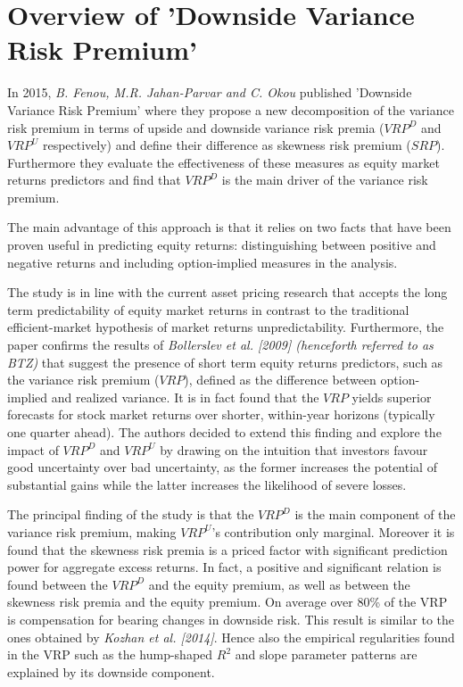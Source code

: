 
\section{Overview of 'Downside Variance Risk Premium'}\label{sec:chapter1}

In 2015,  \textit{ B. Fenou, M.R. Jahan-Parvar and C. Okou} published 'Downside Variance Risk Premium' where they propose a new decomposition of the variance risk premium in terms of upside and downside variance risk premia ($VRP^D$ and $VRP^U$ respectively) and define their difference as skewness risk premium ($SRP$).  Furthermore they evaluate the effectiveness of these measures as equity market returns predictors and find that $VRP^D$ is the main driver of the variance risk premium. 

\vspace{4mm}
The main advantage of this approach is that it relies on two facts that have been proven useful in predicting equity returns: distinguishing between positive and negative returns and including option-implied measures in the analysis. 

\vspace{4mm}
The study is in line with the current asset pricing research that accepts the long term predictability of equity market returns in contrast to the traditional efficient-market hypothesis of market returns unpredictability. 
Furthermore, the paper confirms the results of \textit{ Bollerslev et al. [2009] (henceforth referred to as BTZ)} that suggest the presence of short term equity returns predictors, such as the variance risk premium ($VRP$), defined as the difference between option-implied and realized variance. It is in fact found that the $VRP$ yields superior forecasts for stock market returns over shorter, within-year horizons (typically one quarter ahead). The authors decided to extend this finding and explore the impact of  $VRP^D$ and $VRP^U$ by drawing on the intuition that investors favour good uncertainty over bad uncertainty, as the former increases the potential of substantial gains while the latter increases the likelihood of severe losses.  

\vspace{4mm}
The principal finding of the study is that the $VRP^D$ is the main component of the variance risk premium, making $VRP^U$'s contribution only marginal. Moreover it is found that the skewness risk premia is a priced factor with significant prediction power for aggregate excess returns. In fact, a positive and significant relation is found between the $VRP^D$ and the equity premium, as well as between the skewness risk premia and the equity premium. On average over 80\% of the VRP is compensation for bearing changes in downside risk.  This result is similar to the ones obtained by \textit{Kozhan et al. [2014]}. Hence also the empirical regularities found in the VRP such as the hump-shaped $R^2$ and slope parameter patterns are explained by its downside component.

